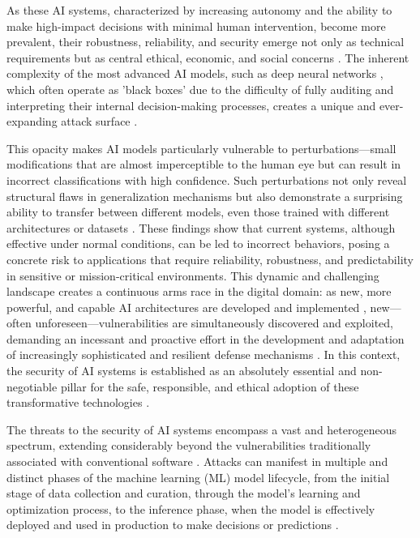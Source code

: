 \documentclass[twoside,brazilian,english]{UNISINOSmonografia}
\begin{document}
As these AI systems, characterized by increasing autonomy and the ability to make high-impact decisions with minimal human intervention, become more prevalent, their robustness, reliability, and security emerge not only as technical requirements but as central ethical, economic, and social concerns \cite{Bommasani2021}. The inherent complexity of the most advanced AI models, such as deep neural networks \cite{Hinton2006}, which often operate as 'black boxes' due to the difficulty of fully auditing and interpreting their internal decision-making processes, creates a unique and ever-expanding attack surface \cite{Papernot2018}.

This opacity makes AI models particularly vulnerable to perturbations—small modifications that are almost imperceptible to the human eye but can result in incorrect classifications with high confidence. Such perturbations not only reveal structural flaws in generalization mechanisms but also demonstrate a surprising ability to transfer between different models, even those trained with different architectures or datasets \cite{Szegedy2014, Goodfellow2015}. These findings show that current systems, although effective under normal conditions, can be led to incorrect behaviors, posing a concrete risk to applications that require reliability, robustness, and predictability in sensitive or mission-critical environments. This dynamic and challenging landscape creates a continuous arms race in the digital domain: as new, more powerful, and capable AI architectures are developed and implemented \cite{Vaswani2017, OpenAI2023}, new—often unforeseen—vulnerabilities are simultaneously discovered and exploited, demanding an incessant and proactive effort in the development and adaptation of increasingly sophisticated and resilient defense mechanisms \cite{Madry2018, Cohen2019}. In this context, the security of AI systems is established as an absolutely essential and non-negotiable pillar for the safe, responsible, and ethical adoption of these transformative technologies \cite{NIST2024}.

The threats to the security of AI systems encompass a vast and heterogeneous spectrum, extending considerably beyond the vulnerabilities traditionally associated with conventional software \cite{Anderson2020}. Attacks can manifest in multiple and distinct phases of the machine learning (ML) model lifecycle, from the initial stage of data collection and curation, through the model's learning and optimization process, to the inference phase, when the model is effectively deployed and used in production to make decisions or predictions \cite{Papernot2018}.
\end{document}
